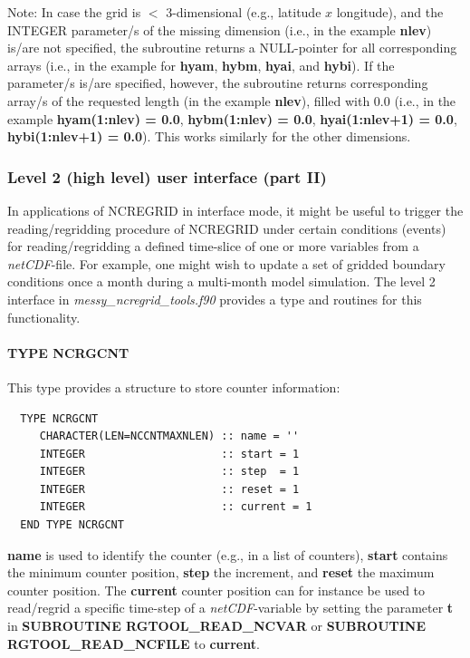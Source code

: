 \documentclass[12pt, a4paper]{article}
\begin{document}
%
Note: In case the grid is $<$ 3-dimensional (e.g., latitude $x$ longitude), and
the INTEGER parameter/s of the missing dimension
(i.e., in the example {\bf nlev})
is/are not specified, the subroutine returns a NULL-pointer for all
corresponding arrays
(i.e., in the example for {\bf hyam}, {\bf hybm}, {\bf hyai}, and {\bf hybi}).
If the parameter/s is/are specified, however, the subroutine returns
corresponding array/s of the requested length
(in the example {\bf nlev}), filled with 0.0 
(i.e., in the example {\bf hyam(1:nlev) = 0.0}, {\bf hybm(1:nlev) = 0.0},
{\bf hyai(1:nlev+1) = 0.0}, {\bf hybi(1:nlev+1) = 0.0}).
This works similarly for the other dimensions.


\subsubsection{Level 2 (high level) user interface (part II)}
\label{sec:level2_2}
In applications of NCREGRID in interface mode, it might be useful
to trigger the reading/regridding procedure of NCREGRID under certain
conditions (events) for reading/regridding a defined time-slice
of one or more variables from a {\it netCDF}-file.
For example, one might wish to update a set of gridded 
boundary conditions once a month during a multi-month model simulation.
The level 2 interface in {\it messy\_ncregrid\_tools.f90} provides
a type and routines for this functionality.

\paragraph{\bf TYPE NCRGCNT}
%
This type provides a structure to store counter information:
\begin{verbatim}
  TYPE NCRGCNT
     CHARACTER(LEN=NCCNTMAXNLEN) :: name = ''
     INTEGER                     :: start = 1
     INTEGER                     :: step  = 1
     INTEGER                     :: reset = 1
     INTEGER                     :: current = 1
  END TYPE NCRGCNT
\end{verbatim}
%
{\bf name} is used to identify the counter (e.g., in a list of counters),
{\bf start} contains the minimum counter position, {\bf step} the increment,
and {\bf reset} the maximum counter position. 
%
The {\bf current} counter position can for instance be used to
read/regrid a specific time-step of a {\it netCDF}-variable by
setting the parameter {\bf t} in
{\bf SUBROUTINE RGTOOL\_READ\_NCVAR} or {\bf SUBROUTINE RGTOOL\_READ\_NCFILE}
to {\bf current}.
\end{document}
